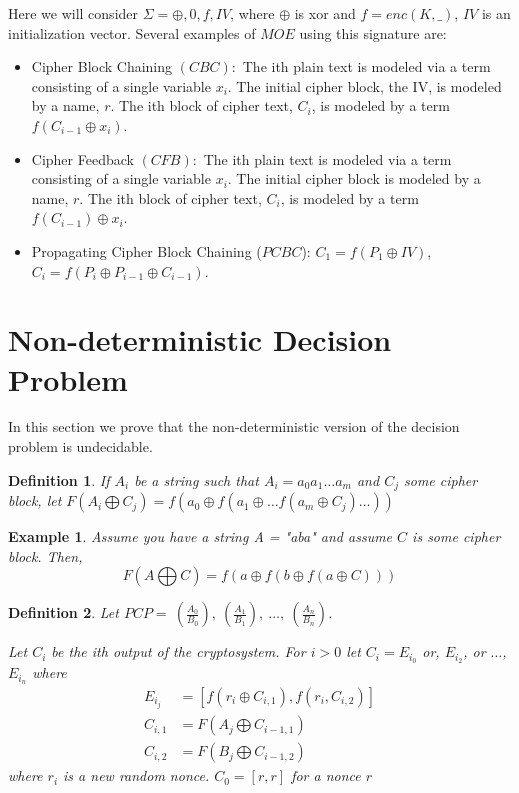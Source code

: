 \documentclass[11pt,twoside,a4paper]{article}
\newtheorem{definition}{Definition}
\newtheorem{example}{Example}
\begin{document}
Here we will consider $\Sigma ={\oplus, 0, f, IV}$, where $\oplus$ is xor and $f=enc(K,\_)$, $IV$ is an initialization vector.
Several examples of $MOE$ using this signature are: 
\begin{itemize}
	\item Cipher Block Chaining $(CBC):$ The ith plain text is modeled via a term consisting of a single variable $x_i$. The initial cipher block, the IV, is modeled by a name, $r$. The ith block of cipher text, $C_i$, is modeled by a
	term $f(C_{i-1} \oplus x_i)$.
	\item Cipher Feedback $(CFB):$ The ith plain text is modeled via a term consisting of a single variable $x_i$. The initial cipher block is modeled by a name, $r$. The ith block of cipher text, $C_i$, is modeled by a
	term $f(C_{i-1}) \oplus x_i$.  
	\item Propagating Cipher Block Chaining ($PCBC$): 
	$C_1 = f(P_1 \oplus IV)$, $C_i = f(P_i \oplus P_{i-1} \oplus C_{i-1})$.
\end{itemize}

\section{Non-deterministic Decision Problem}

In this section we prove that the non-deterministic version 
of the decision problem is undecidable.

\begin{definition}
If $A_i$ be a string such that $A_i = a_0 a_1\ldots a_m$ and 
$C_j$ some cipher block, let $F(A_i \bigoplus C_j) =
f(a_0 \oplus f(a_1 \oplus \ldots f(a_m \oplus C_j) \ldots ))$
\end{definition}

\begin{example}
Assume you have a string A = "aba" and assume $C$ is some cipher
block. Then, 
\[F(A \bigoplus C) = 
f(a \oplus f(b \oplus f(a \oplus C)))
\]
\end{example}



\begin{definition}\label{non-det-func}
Let $PCP = ~(\frac{A_0}{B_0}), ~(\frac{A_1}{B_1}), ~\ldots, ~(\frac{A_n}{B_n})$. 	
	
Let $C_i$ be the ith output of the cryptosystem. 
For $i > 0$ let $C_i = E_{i_0}$ or, $E_{i_2}$, or $\ldots$,
$E_{i_n}$ where 
\begin{align*}
	E_{i_j} &= [f(r_i \oplus C_{i, 1}), f(r_i, C_{i,2}) ] \\
	C_{i,1} &= F(A_j \bigoplus C_{i-1, 1})	\\
	C_{i,2} &= F(B_j \bigoplus C_{i-1, 2}) 
\end{align*}
where $r_i$ is a new random nonce.
$C_0 = [r,r]$ for a nonce $r$
\end{definition}
\end{document}
